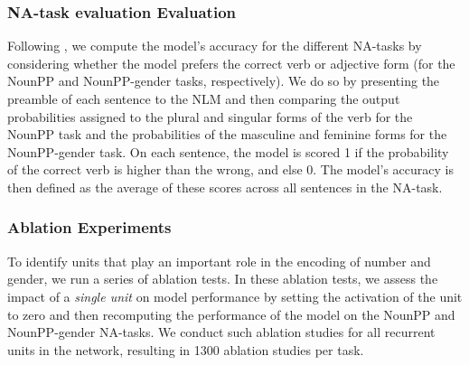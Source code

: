 \subsubsection{NA-task evaluation Evaluation}
Following \citet{Linzen:etal:2016}, we compute the model's accuracy for the different NA-tasks by considering whether the model prefers the correct verb or adjective form (for the NounPP and NounPP-gender tasks, respectively).
We do so by presenting the preamble of each sentence to the NLM and then comparing the output probabilities assigned to the plural and singular forms of the verb for the NounPP task and the probabilities of the masculine and feminine forms for the NounPP-gender task.
On each sentence, the model is scored 1 if the probability of the correct verb is higher than the wrong, and else 0. 
The model's accuracy is then defined as the average of these scores across all sentences in the NA-task. 

\subsubsection{Ablation Experiments}
To identify units that play an important role in the encoding of number and gender, we run a series of ablation tests.
In these ablation tests, we assess the impact of a \emph{single unit} on model performance by setting the activation of the unit to zero and then recomputing the performance of the model on the NounPP and NounPP-gender NA-tasks. 
We conduct such ablation studies for all recurrent units in the network, resulting in 1300 ablation studies per task.

